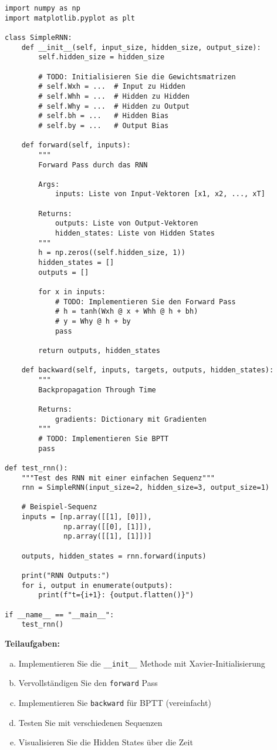 \documentclass[12pt,a4paper]{article}
\begin{document}
\begin{lstlisting}[caption=RNN Grundgerüst]
import numpy as np
import matplotlib.pyplot as plt

class SimpleRNN:
    def __init__(self, input_size, hidden_size, output_size):
        self.hidden_size = hidden_size
        
        # TODO: Initialisieren Sie die Gewichtsmatrizen
        # self.Wxh = ...  # Input zu Hidden
        # self.Whh = ...  # Hidden zu Hidden  
        # self.Why = ...  # Hidden zu Output
        # self.bh = ...   # Hidden Bias
        # self.by = ...   # Output Bias
        
    def forward(self, inputs):
        """
        Forward Pass durch das RNN
        
        Args:
            inputs: Liste von Input-Vektoren [x1, x2, ..., xT]
        
        Returns:
            outputs: Liste von Output-Vektoren
            hidden_states: Liste von Hidden States
        """
        h = np.zeros((self.hidden_size, 1))
        hidden_states = []
        outputs = []
        
        for x in inputs:
            # TODO: Implementieren Sie den Forward Pass
            # h = tanh(Wxh @ x + Whh @ h + bh)
            # y = Why @ h + by
            pass
            
        return outputs, hidden_states
    
    def backward(self, inputs, targets, outputs, hidden_states):
        """
        Backpropagation Through Time
        
        Returns:
            gradients: Dictionary mit Gradienten
        """
        # TODO: Implementieren Sie BPTT
        pass

def test_rnn():
    """Test des RNN mit einer einfachen Sequenz"""
    rnn = SimpleRNN(input_size=2, hidden_size=3, output_size=1)
    
    # Beispiel-Sequenz
    inputs = [np.array([[1], [0]]), 
              np.array([[0], [1]]), 
              np.array([[1], [1]])]
    
    outputs, hidden_states = rnn.forward(inputs)
    
    print("RNN Outputs:")
    for i, output in enumerate(outputs):
        print(f"t={i+1}: {output.flatten()}")

if __name__ == "__main__":
    test_rnn()
\end{lstlisting}

\textbf{Teilaufgaben:}
\begin{enumerate}[(a)]
    \item Implementieren Sie die \texttt{\_\_init\_\_} Methode mit Xavier-Initialisierung
    \item Vervollständigen Sie den \texttt{forward} Pass
    \item Implementieren Sie \texttt{backward} für BPTT (vereinfacht)
    \item Testen Sie mit verschiedenen Sequenzen
    \item Visualisieren Sie die Hidden States über die Zeit
\end{enumerate}
\end{document}
